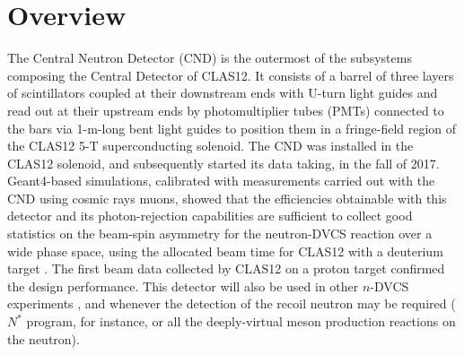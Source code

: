 \section{Overview}
The Central Neutron Detector (CND) is the outermost of the subsystems composing the Central Detector of CLAS12. It consists of a barrel of three layers of scintillators coupled at their downstream ends with U-turn light guides and read out at their upstream ends by photomultiplier tubes (PMTs) connected to the bars via 1-m-long bent light guides to position them in a fringe-field region of the CLAS12 5-T superconducting solenoid. The CND was installed in the CLAS12 solenoid, and subsequently started its data taking, in the fall of 2017. 
Geant4-based simulations, calibrated with measurements carried out with the CND using cosmic rays muons, showed that the efficiencies obtainable with this detector and its photon-rejection capabilities are sufficient to collect good statistics on the beam-spin asymmetry for the neutron-DVCS reaction over a wide phase space, using the allocated beam time for CLAS12 with a deuterium target \cite{Jlab12_CLAS_n}. The first beam data collected by CLAS12 on a proton target confirmed the design performance. This detector will also be used in other $n$-DVCS experiments \cite{Jlab12_CLAS_n_pol}, and whenever the detection of the recoil neutron may be required ($N^*$ program, for instance, or all the deeply-virtual meson production reactions on the neutron).



